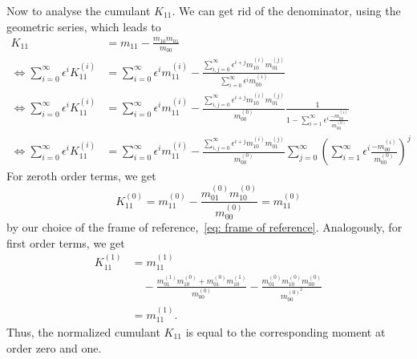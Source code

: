 Now to analyse the cumulant $K_{11}$. We can get rid of the denominator,
using the geometric series, which leads to
\begin{equation}
  \begin{aligned}
    K_{11} & = m_{11} - \frac{m_{10}m_{01}}{m_{00}}\\
    \Leftrightarrow
    \sum_{i=0}^\infty \epsilon^i K_{11}^{(i)}
    & = \sum_{i=0}^\infty \epsilon^i m_{11}^{(i)} -
    \frac{\sum_{i,j=0}^\infty \epsilon^{i+j} m_{10}^{(i)}m_{01}^{(j)}}
        {\sum_{i=0}^\infty \epsilon^i m_{00}^{(i)}}\\
    \Leftrightarrow
    \sum_{i=0}^\infty \epsilon^i K_{11}^{(i)}
    & = \sum_{i=0}^\infty \epsilon^i m_{11}^{(i)} -
    \frac{\sum_{i,j=0}^\infty \epsilon^{i+j} m_{10}^{(i)}m_{01}^{(j)}}
        {m_{00}^{(0)}}
        \frac{1}{1 - \sum_{i=1}^\infty \epsilon^i \frac{ - m_{00}^{(i)}}{ m_{00}^{(0)}}}\\
    \Leftrightarrow
    \sum_{i=0}^\infty \epsilon^i K_{11}^{(i)}
    & = \sum_{i=0}^\infty \epsilon^i m_{11}^{(i)} -
    \frac{\sum_{i,j=0}^\infty \epsilon^{i+j} m_{10}^{(i)}m_{01}^{(j)}}
        {m_{00}^{(0)}}
    \sum_{j=0}^\infty {\left(\sum_{i=1}^\infty \epsilon^i \frac{ - m_{00}^{(i)}}{ m_{00}^{(0)}}\right)}^j
  \end{aligned}
\end{equation}
For zeroth order terms, we get
\begin{equation}
  K_{11}^{(0)} = m_{11}^{(0)} - \frac{m_{01}^{(0)}m_{10}^{(0)}}{m_{00}^{(0)}} =  m_{11}^{(0)}
\end{equation}
by our choice of the frame of reference,~\eqref{eq: frame of reference}.
Analogously, for first order terms, we get
\begin{equation}
  \begin{aligned}
    K_{11}^{(1)} & = m_{11}^{(1)} \\
    &\quad - \frac{m_{01}^{(1)}m_{10}^{(0)}+m_{01}^{(0)}m_{10}^{(1)}}{m_{00}^{(0)}}
    -\frac{m_{01}^{(0)}m_{10}^{(0)}m_{00}^{(0)}}{m_{00}^{{(0)}^2}}  \\
    &= m_{11}^{(1)}.
  \end{aligned}
\end{equation}
Thus, the normalized cumulant $K_{11}$ is equal to the corresponding moment at order zero and one.

